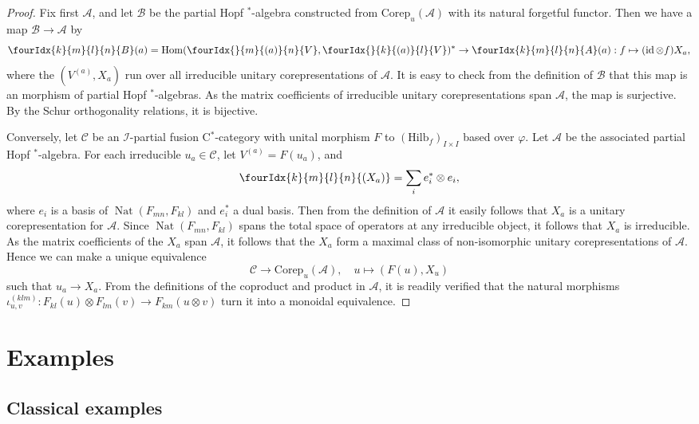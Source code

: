 \documentclass[10pt]{article}
\DeclareMathOperator{\id}{id}
\DeclareMathOperator{\Hom}{Hom}
\DeclareMathOperator{\Nat}{\mathrm{Nat}}
\newcommand{\Corep}{\mathrm{Corep}}
\newcommand{\CatCC}{\mathscr{C}}
\newcommand{\Hilb}{\mathrm{Hilb}}
\newcommand{\Gr}[5]{\fourIdx{#2}{#4}{#3}{#5}{#1}}%
\theoremstyle{definition}
\numberwithin{equation}{section}
\begin{document}
\begin{proof} Fix first $\mathscr{A}$, and let $\mathscr{B}$ be the partial Hopf $^*$-algebra constructed from $\Corep_u(\mathscr{A})$ with its natural forgetful functor. Then we have a map $\mathscr{B} \rightarrow \mathscr{A}$ by \[ \Gr{B}{k}{l}{m}{n}(a) = \Hom(\Gr{V}{}{(a)}{m}{n},\Gr{V}{}{(a)}{k}{l})^* \rightarrow \Gr{A}{k}{l}{m}{n}(a):  f \mapsto (\id\otimes f)X_a,\] where the $(V^{(a)},X_a)$ run over all irreducible unitary corepresentations of $\mathscr{A}$. It is easy to check from the definition of $\mathscr{B}$ that this map is an morphism of partial Hopf $^*$-algebras. As the matrix coefficients of irreducible unitary corepresentations span $\mathscr{A}$, the map is surjective. By the Schur orthogonality relations, it is bijective.

Conversely, let $\CatCC$ be an $\mathscr{I}$-partial fusion C$^*$-category with unital morphism $F$ to $(\Hilb_f)_{I\times I}$ based over $\varphi$. Let $\mathscr{A}$ be the associated partial Hopf $^*$-algebra. For each irreducible $u_a \in \CatCC$, let $V^{(a)} = F(u_a)$, and \[\Gr{(X_a)}{k}{l}{m}{n} = \sum_i e_i^*\otimes e_i,\] where $e_i$ is a basis of $\Nat(F_{mn},F_{kl})$ and $e_i^*$ a dual basis. Then from the definition of $\mathscr{A}$ it easily follows that $X_a$ is a unitary corepresentation for $\mathscr{A}$. Since $\Nat(F_{mn},F_{kl})$ spans the total space of operators at any irreducible object, it follows that $X_a$ is irreducible. As the matrix coefficients of the $X_a$ span $\mathscr{A}$, it follows that the $X_a$ form a maximal class of non-isomorphic unitary corepresentations of $\mathscr{A}$. Hence we can make a unique equivalence \[\CatCC\rightarrow \Corep_u(\mathscr{A}), \quad u \mapsto (F(u),X_u)\] such that $u_a\rightarrow X_a$. From the definitions of the coproduct and product in $\mathscr{A}$, it is readily verified that the natural morphisms $\iota^{(klm)}_{u,v}:F_{kl}(u)\otimes F_{lm}(v)\rightarrow F_{km}(u\otimes v)$ turn it into a monoidal equivalence. 
\end{proof}


\section{Examples}

\subsection{Classical examples}
\end{document}
